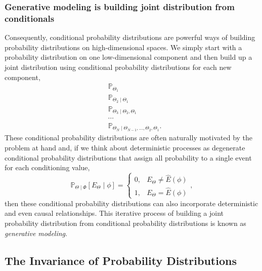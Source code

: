 \documentclass[11pt, oneside]{article}
\newcommand{\PP}{ \mathbb{P} }
\begin{document}
\subsubsection*{Generative modeling is building joint distribution from conditionals}

Consequently, conditional probability distributions are powerful ways of
building probability distributions on high-dimensional spaces.  We simply 
start with a probability distribution on one low-dimensional component and 
then build up a joint distribution using conditional probability distributions 
for each new component,
%
\begin{align*}
& \PP_{\Theta_{1}} \\
& \PP_{\Theta_{2} \mid \Theta_{1}} \\
& \PP_{\Theta_{3} \mid \Theta_{2}, \Theta_{1}} \\
& \cdots \\
& \PP_{\Theta_{N} \mid \Theta_{N - 1}, \ldots, \Theta_{2}, \Theta_{1}}.
\end{align*}
%
These conditional probability distributions are often naturally motivated by
the problem at hand and, if we think about deterministic processes as 
degenerate conditional probability distributions that assign all probability 
to a single event for each conditioning value,
%
\begin{equation*}
\PP_{\Theta \mid \Phi} \! \left[ E_{\Theta} \mid \phi \right]
= 
\left\{
\begin{array}{rr}
0, & E_{\Theta} \ne \hat{E} \! \left( \phi \right) \\
1, & E_{\Theta} = \hat{E} \! \left( \phi \right)
\end{array}
\right.,
\end{equation*}
%
then these conditional probability distributions can also incorporate 
deterministic and even causal relationships.  This iterative process 
of building a joint probability distribution from conditional probability 
distributions is known as \emph{generative modeling}.

\subsection{The Invariance of Probability Distributions}
\end{document}
